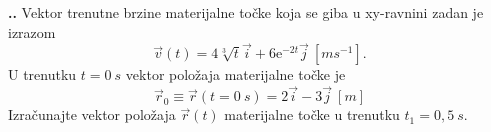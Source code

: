 
\noindent 
\textbf{
\thecjelina.\thezadatak.}
Vektor trenutne brzine materijalne točke koja se giba u xy-ravnini zadan je izrazom
$$
\vec{v}(t)=4\sqrt[3]{t}\vec{i}+6\mathrm{e}^{-2t}\vec{j}\ [ms^{-1}]. 
$$
U trenutku $t = 0\ s$ vektor položaja materijalne točke je
$$
\vec{r}_0\equiv \vec{r}(t=0\ s)=2\vec{i}-3\vec{j}\ [m]
$$
Izračunajte vektor položaja $\vec{r}(t)$ materijalne točke u trenutku $t_1 = 0,5\ s$.
